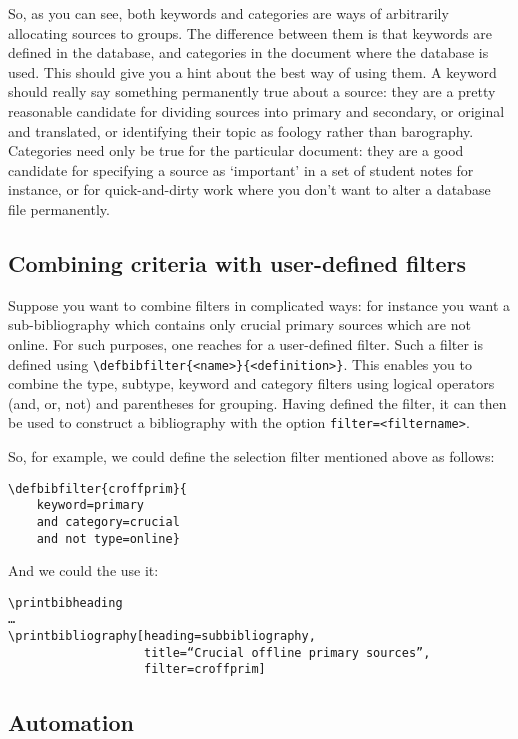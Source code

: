 So, as you can see, both keywords and categories are ways of
arbitrarily allocating sources to groups. The difference between them
is that keywords are defined in the database, and categories in the
document where the database is used. This should give you a hint about
the best way of using them. A keyword should really say something
permanently true about a source: they are a pretty reasonable
candidate for dividing sources into primary and secondary, or original
and translated, or identifying their topic as foology rather than
barography. Categories need only be true for the particular document:
they are a good candidate for specifying a source as `important' in a
set of student notes for instance, or for quick-and-dirty work where
you don't want to alter a database file permanently.

\subsection{Combining criteria with user-defined filters}

Suppose you want to combine filters in complicated ways: for instance
you want a sub-bibliography which contains only crucial primary
sources which are not online. For such purposes, one reaches for a
user-defined filter. Such a filter is defined using
\texttt{\textbackslash{}defbibfilter\{\textless{}name\textgreater{}\}\{\textless{}definition\textgreater{}\}}.
This enables you to combine the type, subtype, keyword and category
filters using logical operators (and, or, not) and parentheses for
grouping. Having defined the filter, it can then be used to construct
a bibliography with the option
\texttt{filter=\textless{}filtername\textgreater{}}.

So, for example, we could define the selection filter mentioned above
as follows:

\begin{Verbatim}
\defbibfilter{croffprim}{
    keyword=primary
    and category=crucial
    and not type=online}
\end{Verbatim}
And we could the use it:

\begin{Verbatim}
\printbibheading
…
\printbibliography[heading=subbibliography,
                   title=“Crucial offline primary sources”,
                   filter=croffprim]
\end{Verbatim}

\subsection{Automation}

